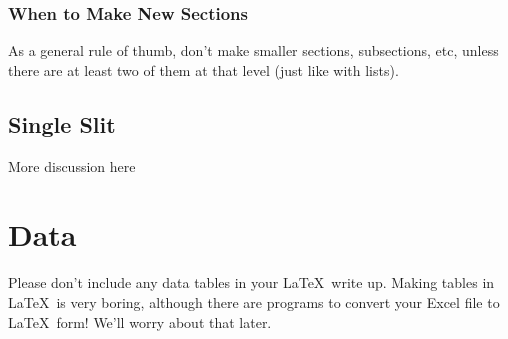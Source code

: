 \documentclass[12pt]{article}
\begin{document}
       \subsubsection{When to Make New Sections}
        	As a general rule of thumb, don't make smaller sections, subsections, etc, unless there are at least two of them at that level (just like with lists).
	
    \subsection{Single Slit}
		More discussion here
        
\section{Data}
	Please don't include any data tables in your \LaTeX\, write up.  Making tables in \LaTeX\, is very boring, although there are programs to convert your Excel file to \LaTeX\, form!  We'll worry about that later.
\end{document}
